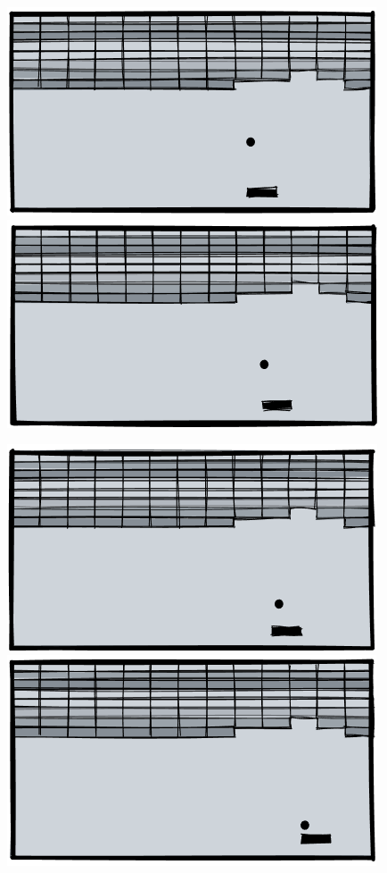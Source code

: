 \begin{figure}[h]
\centering
\begin{minipage}{0.49\linewidth}
  \centering
  \includegraphics[width=0.618\linewidth]{pix/q_learning/game_1.png}
\end{minipage}%
\begin{minipage}{0.49\linewidth}
  \centering
  \includegraphics[width=0.618\linewidth]{pix/q_learning/game_2.png}
\end{minipage}
\end{figure}

\begin{figure}[h]
\centering
\begin{minipage}{0.49\linewidth}
  \centering
  \includegraphics[width=0.618\linewidth]{pix/q_learning/game_3.png}
\end{minipage}%
\begin{minipage}{0.49\linewidth}
  \centering
  \includegraphics[width=0.618\linewidth]{pix/q_learning/game_4.png}
\end{minipage}
\end{figure}


